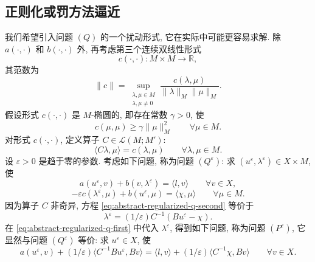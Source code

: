 \setcounter{subsection}{2}
\subsection{正则化或罚方法逼近}\label{subsec:abstract-regularization-penalty}

我们希望引入问题 $(Q)$ 的一个扰动形式, 它在实际中可能更容易求解.
除 $a(\cdot,\cdot)$ 和 $b(\cdot,\cdot)$ 外, 再考虑第三个连续双线性形式
\[
c(\cdot,\cdot):M\times M\longrightarrow\mathbb R,
\]
其范数为
\[
\|c\|=\sup_{\substack{\lambda,\mu\in M\\\lambda,\mu\ne0}}
\frac{c(\lambda,\mu)}{\|\lambda\|_M\|\mu\|_M}.
\]
假设形式 $c(\cdot,\cdot)$ 是 $M$-椭圆的, 即存在常数 $\gamma>0$, 使
\begin{equation}\label{eq:abstract-c-ellipticity}
c(\mu,\mu)\ge\gamma\|\mu\|_M^2
\qquad\forall\mu\in M.
\end{equation}
对形式 $c(\cdot,\cdot)$, 定义算子 $C\in\mathcal L(M;M')$:
\begin{equation}\label{eq:abstract-operator-c}
\langle C\lambda,\mu\rangle=c(\lambda,\mu)
\qquad\forall\lambda,\mu\in M.
\end{equation}
设 $\varepsilon>0$ 是趋于零的参数. 考虑如下问题, 称为问题 $(Q^\varepsilon)$:
求 $(u^\varepsilon,\lambda^\varepsilon)\in X\times M$, 使
\begin{equation}\label{eq:abstract-regularized-q-first}
a(u^\varepsilon,v)+b(v,\lambda^\varepsilon)=\langle l,v\rangle
\qquad\forall v\in X,
\end{equation}
\begin{equation}\label{eq:abstract-regularized-q-second}
-\varepsilon c(\lambda^\varepsilon,\mu)+b(u^\varepsilon,\mu)
=\langle\chi,\mu\rangle
\qquad\forall\mu\in M.
\end{equation}
因为算子 $C$ 非奇异, 方程 
\eqref{eq:abstract-regularized-q-second} 等价于
\begin{equation}\label{eq:abstract-lambda-epsilon}
\lambda^\varepsilon=(1/\varepsilon)C^{-1}(Bu^\varepsilon-\chi).
\end{equation}
在 
\eqref{eq:abstract-regularized-q-first} 中代入 $\lambda^\varepsilon$,
得到如下问题, 称为问题 $(P^\varepsilon)$, 它显然与问题 $(Q^\varepsilon)$ 等价:
求 $u^\varepsilon\in X$, 使
\begin{equation}\label{eq:abstract-penalty-problem}
a(u^\varepsilon,v)+(1/\varepsilon)
\langle C^{-1}Bu^\varepsilon,Bv\rangle
=\langle l,v\rangle+(1/\varepsilon)\langle C^{-1}\chi,Bv\rangle
\qquad\forall v\in X.
\end{equation}


